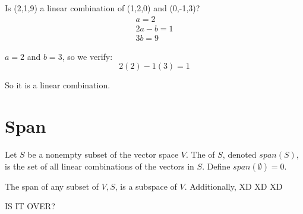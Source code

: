 \documentclass{article}
\begin{document}
\begin{example}[Vectors]
\end{example}

Is (2,1,9) a linear combination of (1,2,0) and (0,-1,3)?
\begin{align*}
    a = 2\\
    2a - b = 1\\
    3b = 9
\end{align*}

$a = 2$ and $b = 3$, so we verify:
\[
2(2) - 1(3) = 1
\]

So it is a linear combination.

\section{Span}
\begin{definition}
    Let $S$ be a nonempty subset of the vector space $V$. The  of $S$, denoted $span(S)$, is the set of all linear combinations of the vectors in $S$. Define $span(\emptyset) = 0$.
\end{definition}

\begin{theorem}
    The span of any subset of $V, S$, is a subspace of $V$. Additionally, XD XD XD

    IS IT OVER?
    
\end{theorem}
\end{document}
